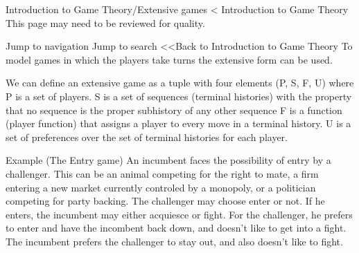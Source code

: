Introduction to Game Theory/Extensive games
< Introduction to Game Theory
This page may need to be reviewed for quality.

Jump to navigation
Jump to search
<<Back to Introduction to Game Theory 
To model games in which the players take turns the extensive form can be used. 

We can define an extensive game as a tuple with four elements (P, S, F, U) where 
P is a set of players.
S is a set of sequences (terminal histories) with the property that no sequence is the proper subhistory of any other sequence
F is a function (player function) that assigns a player to every move in a terminal history.
U is a set of preferences over the set of terminal histories for each player.

Example (The Entry game) An incumbent faces the possibility of entry by a challenger. This can be an animal competing for the right to mate, a firm entering a new market currently controled by a monopoly, or a politician competing for party backing. The challenger may choose enter or not. If he enters, the incumbent may either acquiesce or fight. For the challenger, he prefers to enter and have the incombent back down, and doesn't like to get into a fight. The incumbent prefers the challenger to stay out, and also doesn't like to fight. 
